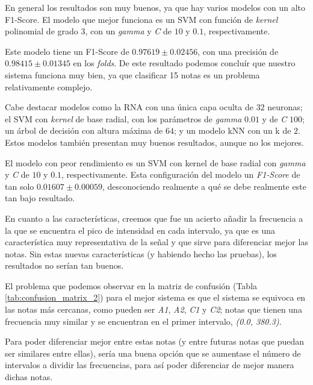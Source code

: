 \documentclass[12pt]{article}
\begin{document}
En general los resultados son muy buenos, ya que hay varios modelos con un alto F1-Score.
El modelo que mejor funciona es un SVM con función de \textit{kernel} polinomial de grado 3, con
un \textit{gamma} y \textit{C} de $10$ y $0.1$, respectivamente.

Este modelo tiene un F1-Score de $0.97619 \pm 0.02456$, con una precisión de $0.98415 \pm 0.01345$ en los \textit{folds}.
De este resultado podemos concluír que nuestro sistema funciona muy bien, ya que clasificar 15 notas es un problema
relativamente complejo.

\bigskip
Cabe destacar modelos como la RNA con una única capa oculta de $32$ neuronas; el SVM con \textit{kernel} de base radial,
con los parámetros de \textit{gamma} $0.01$ y de \textit{C} $100$; un árbol de decisión con altura máxima de $64$; y
un modelo kNN con un k de $2$. Estos modelos también presentan muy buenos resultados, aunque no los mejores.

El modelo con peor rendimiento es un SVM con kernel de base radial con \textit{gamma} y \textit{C} de
$10$ y $0.1$, respectivamente. Esta configuración del modelo un \textit{F1-Score} de tan solo $0.01607 \pm 0.00059$, 
desconociendo realmente a qué se debe realmente este tan bajo resultado.

\bigskip
En cuanto a las características, creemos que fue un acierto añadir la frecuencia a la que se encuentra el pico de intensidad
en cada intervalo, ya que es una característica muy representativa de la señal y que sirve para diferenciar mejor las notas.
Sin estas nuevas características (y habiendo hecho las pruebas), los resultados no serían tan buenos.

\bigskip
El problema que podemos observar en la matriz de confusión (Tabla \ref{tab:confusion_matrix_2}) para el mejor sistema es que el sistema se equivoca
en las notas más cercanas, como pueden ser \textit{A1}, \textit{A2}, \textit{C1} y \textit{C2}; notas que tienen una frecuencia muy similar y se encuentran
en el primer intervalo, \textit{(0.0, 380.3)}. 

\bigskip
Para poder diferenciar mejor entre estas notas (y entre futuras notas
que puedan ser similares entre ellas), sería una buena opción que se aumentase el número de intervalos a dividir
las frecuencias, para así poder diferenciar de mejor manera dichas notas.
\end{document}
